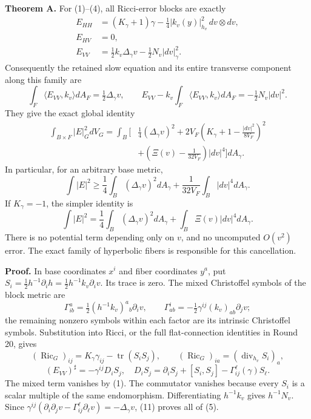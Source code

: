\documentclass[
  11pt,
]{article}
\begin{document}
\textbf{Theorem A.} For (1)--(4), all Ricci-error blocks are exactly \[
 \begin{aligned}
 E_{HH}&=(K_\gamma+1)\gamma
                      -\tfrac14|k_v(y)|_{h_v}^2\,dv\otimes dv,\\
 E_{HV}&=0,\\
 E_{VV}&=\tfrac12 k_v\Delta_\gamma v
                         -\tfrac12N_v|dv|_\gamma^2.
 \end{aligned}
 \tag{5}
\] Consequently the retained slow equation and its entire transverse
component along this family are \[
 \int_F\langle E_{VV},k_v\rangle dA_F
            =\tfrac12\Delta_\gamma v,
 \qquad
 E_{VV}-k_v\int_F\langle E_{VV},k_v\rangle dA_F
            =-\tfrac12N_v|dv|^2.
 \tag{6}
\] They give the exact global identity \[
 \boxed{\begin{aligned}
 \int_{B\times F}|E|_G^2dV_G
 =\int_B\bigg[&\frac14(\Delta_\gamma v)^2
  +2V_F\left(K_\gamma+1-\frac{|dv|^2}{8V_F}\right)^2\\
  &+\left(\Xi(v)-\frac1{32V_F}\right)|dv|^4\bigg]dA_\gamma.
 \end{aligned}}
 \tag{7}
\] In particular, for an arbitrary base metric, \[
 \int|E|^2\ge\frac14\int_B(\Delta_\gamma v)^2dA_\gamma
                  +\frac1{32V_F}\int_B|dv|^4dA_\gamma.
 \tag{8}
\] If \(K_\gamma=-1\), the simpler identity is \[
 \boxed{\quad
 \int|E|^2=\frac14\int_B(\Delta_\gamma v)^2dA_\gamma
                    +\int_B\Xi(v)|dv|^4dA_\gamma.
 \quad}
 \tag{9}
\] There is no potential term depending only on \(v\), and no uncomputed
\(O(v^2)\) error. The exact family of hyperbolic fibers is responsible
for this cancellation.

\textbf{Proof.} In base coordinates \(x^i\) and fiber coordinates
\(y^a\), put
\(S_i=\tfrac12h^{-1}\partial_i h=\tfrac12h^{-1}k_v\partial_i v\). Its
trace is zero. The mixed Christoffel symbols of the block metric are \[
 \Gamma^a_{ib}=\tfrac12(h^{-1}k_v)^a{}_b\partial_i v,
 \qquad
 \Gamma^i_{ab}=-\tfrac12\gamma^{ij}(k_v)_{ab}\partial_jv;
 \tag{10}
\] the remaining nonzero symbols within each factor are its intrinsic
Christoffel symbols. Substitution into Ricci, or the full
flat-connection identities in Round 20, gives \[
 (\operatorname{Ric}_G)_{ij}
    =K_\gamma\gamma_{ij}-\operatorname{tr}(S_iS_j),
 \qquad (\operatorname{Ric}_G)_{ia}
    =(\operatorname{div}_{h_v}S_i)_a,
\] \[
  (E_{VV})^\sharp=-\gamma^{ij}D_iS_j,
  \quad
  D_iS_j=\partial_iS_j+[S_i,S_j]-\Gamma^\ell_{ij}(\gamma)S_\ell.
 \tag{11}
\] The mixed term vanishes by (1). The commutator vanishes because every
\(S_i\) is a scalar multiple of the same endomorphism. Differentiating
\(h^{-1}k_v\) gives \(h^{-1}N_v\). Since
\(\gamma^{ij}(\partial_i\partial_jv-\Gamma^\ell_{ij}\partial_\ell v) =-\Delta_\gamma v\),
(11) proves all of (5).
\end{document}
